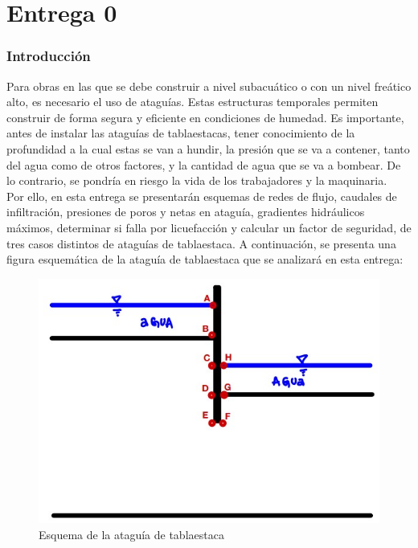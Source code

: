 \documentclass{article}
\begin{document}
\part{Entrega 0}
\section{Introducción}
Para obras en las que se debe construir a nivel subacuático o con un nivel freático alto, es necesario el uso de ataguías. Estas estructuras temporales permiten construir de forma segura y eficiente en condiciones de humedad. Es importante, antes de instalar las ataguías de tablaestacas, tener conocimiento de la profundidad a la cual estas se van a hundir, la presión que se va a contener, tanto del agua como de otros factores, y la cantidad de agua que se va a bombear. De lo contrario, se pondría en riesgo la vida de los trabajadores y la maquinaria. \\

Por ello, en esta entrega se presentarán esquemas de redes de flujo, caudales de infiltración, presiones de poros y netas en ataguía, gradientes hidráulicos máximos, determinar si falla por licuefacción y calcular un factor de seguridad, de tres casos distintos de ataguías de tablaestaca. A continuación, se presenta una figura esquemática de la ataguía de tablaestaca que se analizará en esta entrega:

\begin{figure}[h!]
  \centering
  \includegraphics[width=0.8\linewidth]{graficos/puntos_interes.png}
  \caption{Esquema de la ataguía de tablaestaca}
  \label{fig:enunciado}
\end{figure}
\end{document}
